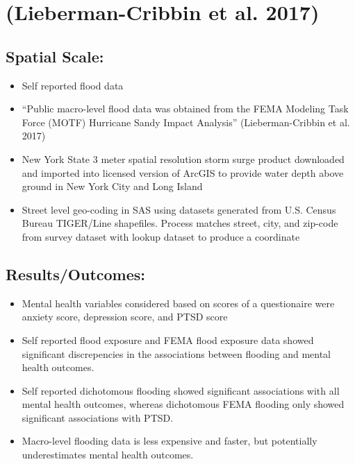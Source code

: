 \documentclass[
]{article}
\providecommand{\tightlist}{%
  \setlength{\itemsep}{0pt}\setlength{\parskip}{0pt}}
\begin{document}
\hypertarget{lieberman2017self}{%
\section{(Lieberman-Cribbin et al. 2017)}\label{lieberman2017self}}

\hypertarget{spatial-scale-2}{%
\subsection{Spatial Scale:}\label{spatial-scale-2}}

\begin{itemize}
\tightlist
\item
  Self reported flood data
\item
  ``Public macro-level flood data was obtained from the FEMA Modeling
  Task Force (MOTF) Hurricane Sandy Impact Analysis'' (Lieberman-Cribbin
  et al. 2017)
\item
  New York State 3 meter spatial resolution storm surge product
  downloaded and imported into licensed version of ArcGIS to provide
  water depth above ground in New York City and Long Island
\item
  Street level geo-coding in SAS using datasets generated from U.S.
  Census Bureau TIGER/Line shapefiles. Process matches street, city, and
  zip-code from survey dataset with lookup dataset to produce a
  coordinate
\end{itemize}

\hypertarget{resultsoutcomes-2}{%
\subsection{Results/Outcomes:}\label{resultsoutcomes-2}}

\begin{itemize}
\tightlist
\item
  Mental health variables considered based on scores of a questionaire
  were anxiety score, depression score, and PTSD score
\item
  Self reported flood exposure and FEMA flood exposure data showed
  significant discrepencies in the associations between flooding and
  mental health outcomes.
\item
  Self reported dichotomous flooding showed significant associations
  with all mental health outcomes, whereas dichotomous FEMA flooding
  only showed significant associations with PTSD.
\item
  Macro-level flooding data is less expensive and faster, but
  potentially underestimates mental health outcomes.
\end{itemize}
\end{document}
